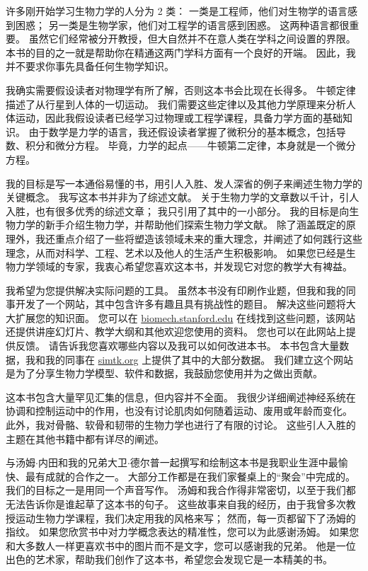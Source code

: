 \documentclass[cn,10pt,citestyle=gb7714-2015, bibstyle=gb7714-2015]{elegantbook}
\begin{document}
许多刚开始学习生物力学的人分为 2 类：
一类是工程师，他们对生物学的语言感到困惑；
另一类是生物学家，他们对工程学的语言感到困惑。
这两种语言都很重要。
虽然它们经常被分开教授，但大自然并不在意人类在学科之间设置的界限。
本书的目的之一就是帮助你在精通这两门学科方面有一个良好的开端。
因此，我并不要求你事先具备任何生物学知识。


我确实需要假设读者对物理学有所了解，否则这本书会比现在长得多。
牛顿定律描述了从行星到人体的一切运动。
我们需要这些定律以及其他力学原理来分析人体运动，因此我假设读者已经学习过物理或工程学课程，具备力学方面的基础知识。
由于数学是力学的语言，我还假设读者掌握了微积分的基本概念，包括导数、积分和微分方程。
毕竟，力学的起点——牛顿第二定律，本身就是一个微分方程。


我的目标是写一本通俗易懂的书，用引人入胜、发人深省的例子来阐述生物力学的关键概念。
我写这本书并非为了综述文献。
关于生物力学的文章数以千计，引人入胜，也有很多优秀的综述文章；
我只引用了其中的一小部分。
我的目标是向生物力学的新手介绍生物力学，并帮助他们探索生物力学文献。
除了涵盖既定的原理外，我还重点介绍了一些将塑造该领域未来的重大理念，并阐述了如何践行这些理念，从而对科学、工程、艺术以及他人的生活产生积极影响。
如果您已经是生物力学领域的专家，我衷心希望您喜欢这本书，并发现它对您的教学大有裨益。


我希望为您提供解决实际问题的工具。
虽然本书没有印刷作业题，但我和我的同事开发了一个网站，其中包含许多有趣且具有挑战性的题目。
解决这些问题将大大扩展您的知识面。
您可以在 \href{biomech.stanford.edu}{biomech.stanford.edu} 在线找到这些问题，该网站还提供讲座幻灯片、教学大纲和其他欢迎您使用的资料。
您也可以在此网站上提供反馈。
请告诉我您喜欢哪些内容以及我可以如何改进本书。
本书包含大量数据，我和我的同事在 \href{simtk.org}{simtk.org} 上提供了其中的大部分数据。
我们建立这个网站是为了分享生物力学模型、软件和数据，我鼓励您使用并为之做出贡献。


这本书包含大量罕见汇集的信息，但内容并不全面。
我很少详细阐述神经系统在协调和控制运动中的作用，也没有讨论肌肉如何随着运动、废用或年龄而变化。
此外，我对骨骼、软骨和韧带的生物力学也进行了有限的讨论。
这些引人入胜的主题在其他书籍中都有详尽的阐述。


与汤姆$\cdot$内田和我的兄弟大卫$\cdot$德尔普一起撰写和绘制这本书是我职业生涯中最愉快、最有成就的合作之一。
大部分工作都是在我们家餐桌上的“聚会”中完成的。
我们的目标之一是用同一个声音写作。
汤姆和我合作得非常密切，以至于我们都无法告诉你是谁起草了这本书的句子。
这些故事来自我的经历，由于我曾多次教授运动生物力学课程，我们决定用我的风格来写；
然而，每一页都留下了汤姆的指纹。
如果您欣赏书中对力学概念表达的精准性，您可以为此感谢汤姆。
如果您和大多数人一样更喜欢书中的图片而不是文字，您可以感谢我的兄弟。
他是一位出色的艺术家，帮助我们创作了这本书，希望您会发现它是一本精美的书。
\end{document}
